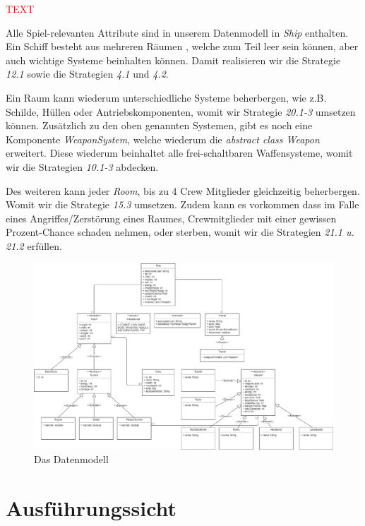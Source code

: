 \documentclass[fontsize=12pt,paper=a4,twoside]{scrartcl}
\begin{document}
\textcolor{red}{TEXT}

Alle Spiel-relevanten Attribute sind in unserem Datenmodell in \textit{Ship} enthalten. Ein Schiff besteht aus mehreren Räumen , welche zum Teil leer sein können, aber auch wichtige Systeme beinhalten können. Damit realisieren wir die Strategie \textit{12.1} sowie die Strategien \textit{4.1} und \textit{4.2}.

Ein Raum kann wiederum unterschiedliche Systeme beherbergen, wie z.B. Schilde, Hüllen oder Antriebskomponenten, womit wir Strategie \textit{20.1-3} umsetzen können. Zusätzlich zu den oben genannten Systemen, gibt es noch eine Komponente \textit{WeaponSystem}, welche wiederum die \textit{abstract class Weapon} erweitert. Diese wiederum beinhaltet alle frei-schaltbaren Waffensysteme, womit wir die Strategien \textit{10.1-3} abdecken.

Des weiteren kann jeder \textit{Room}, bis zu 4 Crew Mitglieder gleichzeitig beherbergen. Womit wir die Strategie \textit{15.3} umsetzen. Zudem kann es vorkommen dass im Falle eines Angriffes/Zerstörung eines Raumes, Crewmitglieder mit einer gewissen Prozent-Chance schaden nehmen, oder sterben, womit wir die Strategien \textit{21.1 u. 21.2} erfüllen.

\begin{figure}[H]
\begin{center}
  \includegraphics[width=\linewidth]{UML/Datenmodell.pdf}
    \caption{Das Datenmodell}
\end{center}
\end{figure}


\section{Ausführungssicht} \label{sec:ausfuehrung}
\end{document}
